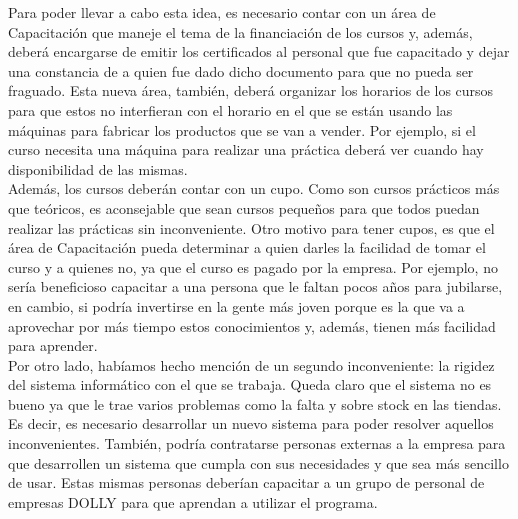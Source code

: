 \documentclass[a4paper,10pt,titlepage]{article}
\begin{document}
		\indent Para poder llevar a cabo esta idea, es necesario contar con un área de Capacitación que maneje el tema de la financiación de los cursos y, además, deberá encargarse de emitir los certificados al personal que fue capacitado y dejar una constancia de a quien fue dado dicho documento para que no pueda ser fraguado. Esta nueva área, también, deberá organizar los horarios de los cursos para que estos no interfieran con el horario en el que se están usando las máquinas para fabricar los productos que se van a vender.  Por ejemplo, si el curso necesita una máquina para realizar una práctica deberá ver cuando hay disponibilidad de las mismas.\\
		\indent Además, los cursos deberán contar con un cupo. Como son cursos prácticos más que teóricos, es aconsejable que sean cursos pequeños para que todos puedan realizar las prácticas sin inconveniente. Otro motivo para tener cupos, es que el área de Capacitación pueda determinar a quien darles la facilidad de tomar el curso y a quienes no, ya que el curso es pagado por la empresa. Por ejemplo, no sería beneficioso capacitar a una persona que le faltan pocos años para jubilarse, en cambio, si podría invertirse en la gente más joven porque es la que va a aprovechar por más tiempo estos conocimientos y, además, tienen más facilidad para aprender. \\
		\indent Por otro lado, habíamos hecho mención de un segundo inconveniente: la rigidez del sistema informático con el que se trabaja. Queda claro que el sistema no es bueno ya que le trae varios problemas como la falta y sobre stock en las tiendas. Es decir, es necesario desarrollar un nuevo sistema para poder resolver aquellos inconvenientes. También, podría contratarse personas externas a la empresa para que desarrollen un sistema que cumpla con sus necesidades y que sea más sencillo de usar. Estas mismas personas deberían capacitar a un grupo de personal de empresas DOLLY para que aprendan a utilizar el programa.\\
	\vspace{0.5cm}
\end{document}
